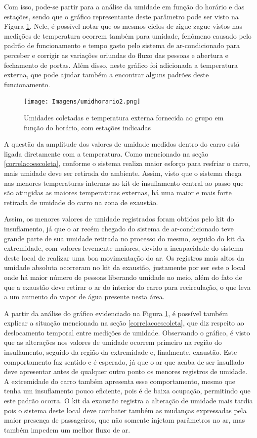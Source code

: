 \documentclass[acronym,symbols,table]{fei}
\begin{document}
Com isso, pode-se partir para a análise da umidade em função do horário e das estações, sendo que o gráfico representante deste parâmetro pode ser visto na Figura \ref{fig:umidhorario}. Nele, é possível notar que os mesmos ciclos de zigue-zague vistos nas medições de temperatura ocorrem também para umidade, fenômeno causado pelo padrão de funcionamento e tempo gasto pelo sistema de ar-condicionado para perceber e corrigir as variações oriundas do fluxo das pessoas e abertura e fechamento de portas. Além disso, neste gráfico foi adicionada a temperatura externa, que pode ajudar também a encontrar alguns padrões deste funcionamento.

\begin{figure}[!htb]
    \centering
    \caption{Umidades coletadas e temperatura externa fornecida ao grupo em função do horário, com estações indicadas}
    \texttt{[image: Imagens/umidhorario2.png]}
    \label{fig:umidhorario}
\end{figure}

A questão da amplitude dos valores de umidade medidos dentro do carro está ligada diretamente com a temperatura. Como mencionado na seção \ref{correlacoescoleta}, conforme o sistema realiza maior esforço para resfriar o carro, mais umidade deve ser retirada do ambiente. Assim, visto que o sistema chega nas menores temperaturas internas no kit de insuflamento central ao passo que são atingidas as maiores temperaturas externas, há uma maior e mais forte retirada de umidade do carro na zona de exaustão. 

Assim, os menores valores de umidade registrados foram obtidos pelo kit do insuflamento, já que o ar recém chegado do sistema de ar-condicionado teve grande parte de sua umidade retirada no processo do mesmo, seguido do kit da extremidade, com valores levemente maiores, devido a incapacidade do sistema deste local de realizar uma boa movimentação do ar. Os registros mais altos da umidade absoluta ocorreram no kit da exaustão, justamente por ser este o local onde há maior número de pessoas liberando umidade no meio, além do fato de que a exaustão deve retirar o ar do interior do carro para recirculação, o que leva a um aumento do vapor de água presente nesta área.

A partir da análise do gráfico evidenciado na Figura \ref{fig:umidhorario}, é possível também explicar a situação mencionada na seção \ref{correlacoescoleta}, que diz respeito ao deslocamento temporal entre medições de umidade. Observando o gráfico, é visto que as alterações nos valores de umidade ocorrem primeiro na região do insuflamento, seguido da região da extremidade e, finalmente, exaustão. Este comportamento faz sentido e é esperado, já que o ar que acaba de ser insuflado deve apresentar antes de qualquer outro ponto os menores registros de umidade. A extremidade do carro também apresenta esse comportamento, mesmo que tenha um insuflamento pouco eficiente, pois é de baixa ocupação, permitindo que este padrão ocorra. O kit da exaustão registra a alteração de umidade mais tardia pois o sistema deste local deve combater também as mudanças expressadas pela maior presença de passageiros, que não somente injetam parâmetros no ar, mas também impedem um melhor fluxo de ar. 
\end{document}
